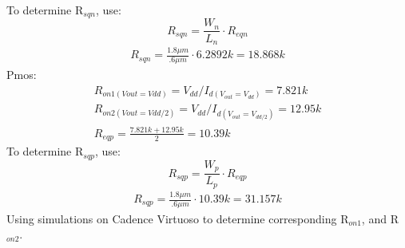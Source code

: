 \documentclass{article}
\begin{document}
   To determine R$_{sqn}$, use:
   \begin{displaymath}
   R_{sqn}= \frac {W_{n}}{L_{n}} \cdot R_{eqn} 
   \end{displaymath}
   \begin{gather}
   R_{sqn}= \frac {1.8\mu m}{.6\mu m} \cdot 6.2892k= 18.868k
   \end{gather}
   Pmos:
   \begin{gather}
    R_{on1(Vout=Vdd)}=V_{dd}/I_{d(V_{out}=V_{dd})}=7.821k                  
   \\
   R_{on2(Vout=Vdd/2)}= V_{dd}/I_{d(V_{out}=V_{dd/2})}=12.95k
   \\
   R_{eqp}= \frac{{7.821k}+{12.95k}}{2} =10.39k
   \end{gather}
   To determine R$_{sqp}$, use:
   \begin{displaymath}
   R_{sqp}= \frac {W_{p}}{L_{p}} \cdot R_{eqp} 
   \end{displaymath}
   \begin{gather}
   R_{sqp}= \frac {1.8\mu m}{.6\mu m} \cdot 10.39k= 31.157k
   \end{gather}
   Using simulations on Cadence Virtuoso to determine corresponding R$_{on1}$, and R$_{on2}$.
	\newpage
\end{document}
